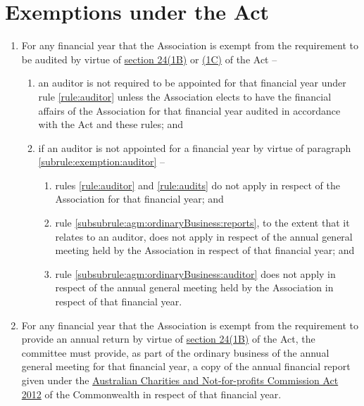 \section{Exemptions under the Act}
\label{rule:exemption}

\begin{enumerate}
	\item For any financial year that the Association is exempt from the requirement to be audited by virtue of \href{https://www.legislation.tas.gov.au/view/html/inforce/current/act-1964-064#GS24@Gs1B@EN}{section 24(1B)} or \href{https://www.legislation.tas.gov.au/view/html/inforce/current/act-1964-064#GS24@Gs1C@EN}{(1C)} of the Act --
	\begin{enumerate}
		\item \label{subrule:exemption:auditor} an auditor is not required to be appointed for that financial year under rule \ref{rule:auditor} unless the Association elects to have the financial affairs of the Association for that financial year audited in accordance with the Act and these rules; and
		
		\item if an auditor is not appointed for a financial year by virtue of paragraph \ref{subrule:exemption:auditor} --
		\begin{enumerate}
			\item rules \ref{rule:auditor} and \ref{rule:audits} do not apply in respect of the Association for that financial year; and
			\item rule \ref{subsubrule:agm:ordinaryBusiness:reports}, to the extent that it relates to an auditor, does not apply in respect of the annual general meeting held by the Association in respect of that financial year; and
			\item rule \ref{subsubrule:agm:ordinaryBusiness:auditor} does not apply in respect of the annual general meeting held by the Association in respect of that financial year.
		\end{enumerate}
	\end{enumerate}
	
	\item For any financial year that the Association is exempt from the requirement to provide an annual return by virtue of \href{https://www.legislation.tas.gov.au/view/html/inforce/current/act-1964-064#GS24@Gs1B@EN}{section 24(1B)} of the Act, the committee must provide, as part of the ordinary business of the annual general meeting for that financial year, a copy of the annual financial report given under the \href{https://www.legislation.gov.au/Details/C2016C00306}{Australian Charities and Not-for-profits Commission Act 2012} of the Commonwealth in respect of that financial year.
\end{enumerate}